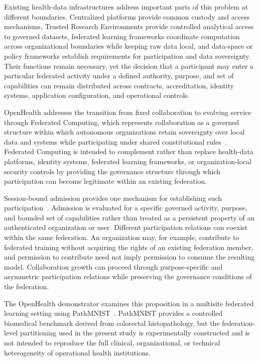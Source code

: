 \documentclass[twoside,11pt]{article}
\begin{document}
Existing health-data infrastructures address important parts of this problem at different boundaries. Centralized platforms provide common custody and access mechanisms, Trusted Research Environments provide controlled analytical access to governed datasets, federated learning frameworks coordinate computation across organizational boundaries while keeping raw data local, and data-space or policy frameworks establish requirements for participation and data sovereignty. Their functions remain necessary, yet the decision that a participant may enter a particular federated activity under a defined authority, purpose, and set of capabilities can remain distributed across contracts, accreditation, identity systems, application configuration, and operational controls.

OpenHealth addresses the transition from fixed collaboration to evolving service through Federated Computing, which represents collaboration as a governed structure within which autonomous organizations retain sovereignty over local data and systems while participating under shared constitutional rules~\cite{Fenoglio_RSOS_2026, Fenoglio_FCaC_2026}. Federated Computing is intended to complement rather than replace health-data platforms, identity systems, federated learning frameworks, or organization-local security controls by providing the governance structure through which participation can become legitimate within an existing federation.

Session-bound admission provides one mechanism for establishing such participation~\cite{Fenoglio_FLICS_2026}. Admission is evaluated for a specific governed activity, purpose, and bounded set of capabilities rather than treated as a persistent property of an authenticated organization or user. Different participation relations can  coexist within the same federation. An organization may, for example, contribute to federated training without acquiring the rights of an existing federation member, and permission to contribute need not imply permission to consume the resulting model. Collaboration growth can   proceed through purpose-specific and asymmetric participation relations while preserving the governance conditions of the federation.

The OpenHealth demonstrator examines this proposition in a multisite federated learning setting using PathMNIST~\cite{Yang_2023_MedMNIST, Kather_2019}. 
PathMNIST provides a controlled biomedical benchmark derived from colorectal histopathology, but the federation-level partitioning used in the present study is experimentally constructed and is not intended to reproduce the full clinical, organizational, or technical heterogeneity of operational health institutions.
\end{document}
